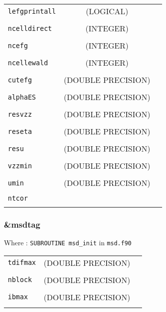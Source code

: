 \documentclass[10pt,a4paper]{article}
\begin{document}
\begin{tabular}{lcc}
\\
\verb?lefgprintall? & (LOGICAL) & \\
\\
\verb?ncelldirect?  & (INTEGER) & \\
\\
\verb?ncefg?        & (INTEGER) & \\
\\
\verb?ncellewald?   & (INTEGER) & \\
\\
\verb?cutefg?  & (DOUBLE PRECISION) & \\
\\
\verb?alphaES? & (DOUBLE PRECISION) & \\
\\
\verb?resvzz?  & (DOUBLE PRECISION) & \\
\\
\verb?reseta?  & (DOUBLE PRECISION) & \\
\\
\verb?resu?    & (DOUBLE PRECISION) & \\
\\
\verb?vzzmin?  & (DOUBLE PRECISION) & \\ 
\\
\verb?umin?    & (DOUBLE PRECISION) & \\
\\
\verb?ntcor? & & \\
\\
\end{tabular}


\subsubsection{\&msdtag}

Where : \verb?SUBROUTINE msd_init? in \verb?msd.f90?

\begin{tabular}{lcc}
\\
\verb?tdifmax? & (DOUBLE PRECISION) & \\
\\
\verb?nblock? & (DOUBLE PRECISION) & \\
\\
\verb?ibmax? & (DOUBLE PRECISION) & \\
\\
\end{tabular}
\end{document}
